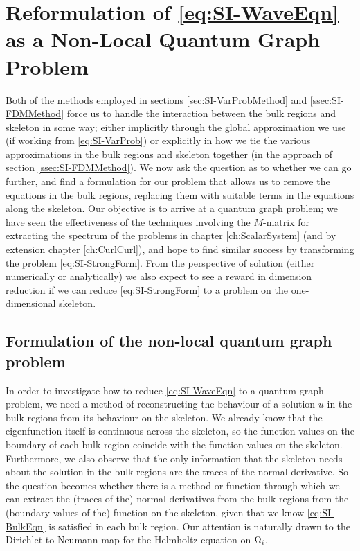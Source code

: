 \section{Reformulation of \eqref{eq:SI-WaveEqn} as a Non-Local Quantum Graph Problem} \label{sec:SI-NonLocalQG}
Both of the methods employed in sections \ref{sec:SI-VarProbMethod} and \ref{ssec:SI-FDMMethod} force us to handle the interaction between the bulk regions and skeleton in some way; either implicitly through the global approximation we use (if working from \eqref{eq:SI-VarProb}) or explicitly in how we tie the various approximations in the bulk regions and skeleton together (in the approach of section \ref{ssec:SI-FDMMethod}).
We now ask the question as to whether we can go further, and find a formulation for our problem that allows us to remove the equations in the bulk regions, replacing them with suitable terms in the equations along the skeleton.
Our objective is to arrive at a quantum graph problem; we have seen the effectiveness of the techniques involving the $M$-matrix for extracting the spectrum of the problems in chapter \ref{ch:ScalarSystem} (and by extension chapter \ref{ch:CurlCurl}), and hope to find similar success by transforming the problem \eqref{eq:SI-StrongForm}.
From the perspective of solution (either numerically or analytically) we also expect to see a reward in dimension reduction if we can reduce \eqref{eq:SI-StrongForm} to a problem on the one-dimensional skeleton.

\subsection{Formulation of the non-local quantum graph problem} \label{ssec:SI-ToQG}
In order to investigate how to reduce \eqref{eq:SI-WaveEqn} to a quantum graph problem, we need a method of reconstructing the behaviour of a solution $u$ in the bulk regions from its behaviour on the skeleton.
We already know that the eigenfunction itself is continuous across the skeleton, so the function values on the boundary of each bulk region coincide with the function values on the skeleton.
Furthermore, we also observe that the only information that the skeleton needs about the solution in the bulk regions are the traces of the normal derivative.
So the question becomes whether there is a method or function through which we can extract the (traces of the) normal derivatives from the bulk regions from the (boundary values of the) function on the skeleton, given that we know \eqref{eq:SI-BulkEqn} is satisfied in each bulk region.
Our attention is naturally drawn to the Dirichlet-to-Neumann map for the Helmholtz equation on $\Omega_i$.

